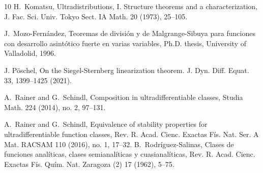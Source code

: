 \documentclass[11pt,a4paper]{article}
\theoremstyle{plain}
\theoremstyle{definition}
\begin{document}
\begin{thebibliography}{10}
	H.~Komatsu, Ultradistributions, I. Structure theorems and a characterization, J. Fac. Sci. Univ. Tokyo Sect. IA Math. 20 (1973), 25--105.

%

	

	J.~Mozo-Fernández, Teoremas de división y de Malgrange-Sibuya para funciones con desarrollo asintótico fuerte en varias variables, Ph.D. thesis, University of Valladolid, 1996.

    J. Pöschel, On the Siegel-Sternberg linearization theorem. J. Dyn. Diff. Equat. 33, 1399--1425 (2021). %
	
	A.~Rainer and G.~Schindl, Composition in ultradifferentiable classes, Studia Math. 224 (2014), no. 2, 97--131.
	
	A.~Rainer and G.~Schindl, Equivalence of stability properties for ultradifferentiable function classes, Rev. R. Acad. Cienc. Exactas Fís. Nat. Ser. A Mat. RACSAM 110 (2016), no. 1, 17--32.
%	
%	
%	
	B.~Rodríguez-Salinas, Clases de funciones analíticas, clases semianalíticas y cuasianalíticas, Rev. R. Acad. Cienc. Exactas Fís. Quím. Nat. Zaragoza (2) 17 (1962), 5--75.
%	
%
%	
	

\end{thebibliography}
\end{document}
